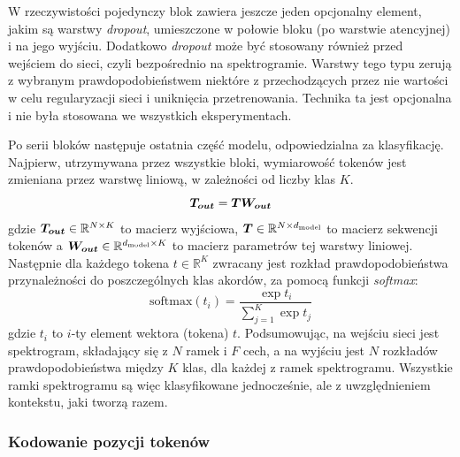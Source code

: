 W rzeczywistości pojedynczy blok zawiera jeszcze jeden opcjonalny element, jakim są warstwy
\emph{dropout}, umieszczone w połowie bloku (po warstwie atencyjnej) i na jego wyjściu. Dodatkowo
\emph{dropout} może być stosowany również przed wejściem do sieci, czyli bezpośrednio na
spektrogramie. Warstwy tego typu zerują z wybranym prawdopodobieństwem niektóre z przechodzących
przez nie wartości w celu regularyzacji sieci i uniknięcia przetrenowania. Technika ta jest
opcjonalna i nie była stosowana we wszystkich eksperymentach.

Po serii bloków następuje ostatnia część modelu, odpowiedzialna za klasyfikację. Najpierw,
utrzymywana przez wszystkie bloki, wymiarowość tokenów jest zmieniana przez warstwę liniową, w
zależności od liczby klas $K$.
\begin{equation}
    \boldsymbol{T_{out}} = \boldsymbol{T} \boldsymbol{W_{out}}
\end{equation}
gdzie $\boldsymbol{T_{out}} \in \mathbb{R}^{N \times K}$ to macierz wyjściowa, $\boldsymbol{T} \in \mathbb{R}^{N \times d_{\mathrm{model}}}$ to
macierz sekwencji tokenów a $\boldsymbol{W_{out}} \in \mathbb{R}^{d_{\mathrm{model}} \times K}$ to macierz parametrów tej
warstwy liniowej. Następnie dla każdego tokena $t \in \mathbb{R}^K$ zwracany jest rozkład
prawdopodobieństwa przynależności do poszczególnych klas akordów, za pomocą funkcji \emph{softmax}:
\begin{equation}
    \textrm{softmax}(t_i) = \frac{\exp{t_i}}{\sum_{j=1}^{K}\exp{t_j}}
\end{equation}
gdzie $t_i$ to $i$-ty element wektora (tokena) $t$. Podsumowując, na wejściu sieci jest spektrogram,
składający się z $N$ ramek i $F$ cech, a na wyjściu jest $N$ rozkładów prawdopodobieństwa między $K$
klas, dla każdej z ramek spektrogramu. Wszystkie ramki spektrogramu są więc klasyfikowane
jednocześnie, ale z uwzględnieniem kontekstu, jaki tworzą razem.

\subsubsection{Kodowanie pozycji tokenów}

